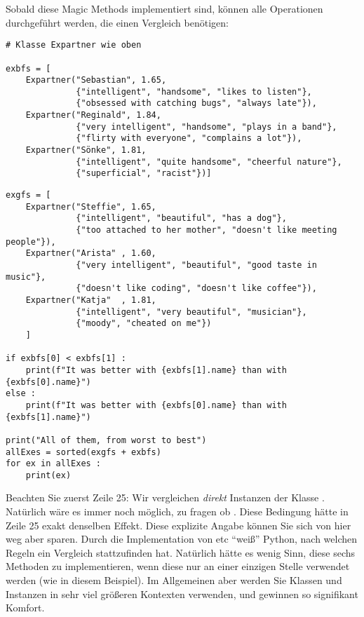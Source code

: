 Sobald diese Magic Methods implementiert sind, können alle Operationen durchgeführt werden, die einen Vergleich benötigen:

\begin{codebox}
\begin{verbatim}
# Klasse Expartner wie oben

exbfs = [
    Expartner("Sebastian", 1.65,
              {"intelligent", "handsome", "likes to listen"},
              {"obsessed with catching bugs", "always late"}),
    Expartner("Reginald", 1.84,
              {"very intelligent", "handsome", "plays in a band"},
              {"flirty with everyone", "complains a lot"}),
    Expartner("Sönke", 1.81,
              {"intelligent", "quite handsome", "cheerful nature"},
              {"superficial", "racist"})]
\end{verbatim}
\end{codebox}
\begin{codebox}[]
\begin{verbatim}
exgfs = [
    Expartner("Steffie", 1.65, 
              {"intelligent", "beautiful", "has a dog"},
              {"too attached to her mother", "doesn't like meeting people"}),
    Expartner("Arista" , 1.60,
              {"very intelligent", "beautiful", "good taste in music"},
              {"doesn't like coding", "doesn't like coffee"}),
    Expartner("Katja"  , 1.81,
              {"intelligent", "very beautiful", "musician"},
              {"moody", "cheated on me"})
    ]

if exbfs[0] < exbfs[1] :
    print(f"It was better with {exbfs[1].name} than with {exbfs[0].name}")
else :
    print(f"It was better with {exbfs[0].name} than with {exbfs[1].name}")

print("All of them, from worst to best")
allExes = sorted(exgfs + exbfs)
for ex in allExes :
    print(ex)
\end{verbatim}
\end{codebox}

Beachten Sie zuerst Zeile 25: Wir vergleichen \emph{direkt} Instanzen der Klasse . Natürlich wäre es immer noch möglich, zu fragen ob . Diese Bedingung hätte in Zeile 25 exakt denselben Effekt. Diese explizite Angabe können Sie sich von hier weg aber sparen. Durch die Implementation von  etc \enquote{weiß} Python, nach welchen Regeln ein Vergleich stattzufinden hat. Natürlich hätte es wenig Sinn, diese sechs Methoden zu implementieren, wenn diese nur an einer einzigen Stelle verwendet werden (wie in diesem Beispiel). Im Allgemeinen aber werden Sie Klassen und Instanzen in sehr viel größeren Kontexten verwenden, und gewinnen so signifikant Komfort.


